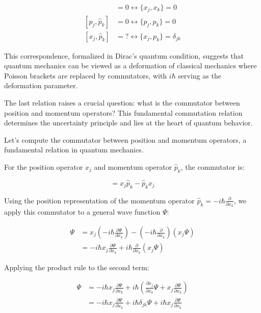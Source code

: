 \documentclass[italian]{HKNdocument}
\begin{document}
\begin{align*}
[x_{j}, x_{k}] &= 0 \longleftrightarrow \{x_{j}, x_{k}\} = 0 \\
[\hat{p}_{j}, \hat{p}_{k}] &= 0 \longleftrightarrow \{p_{j}, p_{k}\} = 0 \tag{1.56} \\
[x_{j}, \hat{p}_{k}] &= ? \longleftrightarrow \{x_{j}, p_{k}\} = \delta_{j k}
\end{align*}

This correspondence, formalized in Dirac's quantum condition, suggests that quantum mechanics can be viewed as a deformation of classical mechanics where Poisson brackets are replaced by commutators, with $i\hbar$ serving as the deformation parameter.

The last relation raises a crucial question: what is the commutator between position and momentum operators? This fundamental commutation relation determines the uncertainty principle and lies at the heart of quantum behavior.


Let's compute the commutator between position and momentum operators, a fundamental relation in quantum mechanics.

For the position operator $x_j$ and momentum operator $\hat{p}_k$, the commutator is:

\begin{equation*}
[x_j, \hat{p}_k] = x_j\hat{p}_k - \hat{p}_k x_j \tag{1.57}
\end{equation*}

Using the position representation of the momentum operator $\hat{p}_k = -i\hbar\frac{\partial}{\partial x_k}$, we apply this commutator to a general wave function $\Psi$:

\begin{align*}
[x_j, \hat{p}_k]\Psi &= x_j\left(-i\hbar\frac{\partial\Psi}{\partial x_k}\right) - \left(-i\hbar\frac{\partial}{\partial x_k}\right)(x_j\Psi) \\
&= -i\hbar x_j\frac{\partial\Psi}{\partial x_k} + i\hbar\frac{\partial}{\partial x_k}(x_j\Psi)
\end{align*}

Applying the product rule to the second term:

\begin{align*}
[x_j, \hat{p}_k]\Psi &= -i\hbar x_j\frac{\partial\Psi}{\partial x_k} + i\hbar\left(\frac{\partial x_j}{\partial x_k}\Psi + x_j\frac{\partial\Psi}{\partial x_k}\right) \tag{1.58} \\
&= -i\hbar x_j\frac{\partial\Psi}{\partial x_k} + i\hbar\delta_{jk}\Psi + i\hbar x_j\frac{\partial\Psi}{\partial x_k}
\end{align*}
\end{document}
